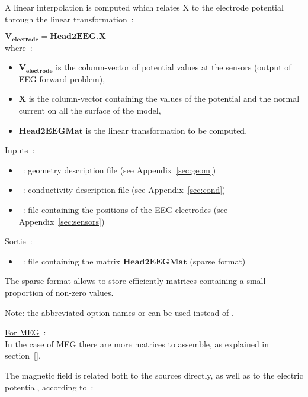 A linear interpolation is computed which relates X to the electrode potential through the linear transformation~:
\medskip

\noindent
 $\mathbf{V_{electrode}} = \mathbf{Head2EEG} . \mathbf{X}$\\
where~:\\ 
\begin{itemize}
    \item $\mathbf{V_{electrode}}$ is the column-vector of potential values at the sensors (output of EEG forward problem),
    \item $\mathbf{X}$ is the column-vector containing the values of the potential and the normal current on all the surface of the model,
    \item $\mathbf{Head2EEGMat}$ is the linear transformation to be computed.
\end{itemize}

\bigskip

\noindent
Inputs~:
\begin{itemize}
    \item {}~: geometry description file (see Appendix~\ref{sec:geom})
    \item {}~: conductivity description file (see Appendix~\ref{sec:cond})
    \item {}~: file containing the positions of the EEG electrodes (see Appendix~\ref{sec:sensors})
\end{itemize}
Sortie~:
\begin{itemize}
    \item {}~: file containing the matrix $\mathbf{Head2EEGMat}$ (sparse format)
\end{itemize}
The sparse format allows to store efficiently matrices containing a small proportion of non-zero values.
\medskip

\noindent
{}
\medskip
Note: the abbreviated option names  or  can be used instead of .

\bigskip

\checkItem \underline{For MEG}~:\\
In the case of MEG there are more matrices to assemble, as explained in section~\ref{}.

The magnetic field is related both to the sources directly, as well as to the electric  potential, according to~:

